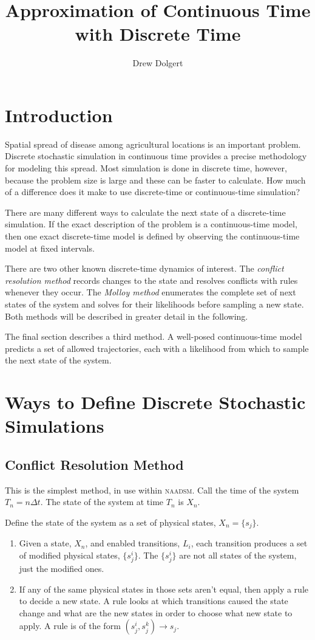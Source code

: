 \documentclass{article}
\title{Approximation of Continuous Time with Discrete Time}
\author{Drew Dolgert}
\begin{document}
\maketitle

\section{Introduction}
Spatial spread of disease among agricultural locations
is an important problem.
Discrete stochastic simulation in continuous time provides
a precise methodology for modeling this spread.
Most simulation is done in discrete time, however,
because the problem size is large and
these can be faster to calculate.
How much of a difference does it make to use discrete-time
or continuous-time simulation?

There are many different ways to calculate the next state of
a discrete-time simulation. If the exact description of the
problem is a continuous-time model, then one exact
discrete-time model is defined by observing the continuous-time
model at fixed intervals.

There are two other known discrete-time dynamics of interest.
The \emph{conflict resolution method} records changes
to the state and resolves conflicts with rules whenever they
occur. The \emph{Molloy method} enumerates the complete
set of next states of the system and solves for their
likelihoods before sampling a new state. Both
methods will be described in greater detail in the following.

The final section describes a third method.
A well-posed continuous-time model predicts a set of
allowed trajectories, each with a likelihood from
which to sample the next state of the system.

\section{Ways to Define Discrete Stochastic Simulations}
\subsection{Conflict Resolution Method}
This is the simplest method, in use within \textsc{naadsm}.
Call the time of the system $T_n=n\Delta t$. The state of
the system at time $T_n$ is $X_n$.

Define the state of the system as a set of physical
states, $X_n=\{s_j\}$.
\begin{enumerate}
\item Given a state, $X_n$, and enabled transitions, $L_i$,
each transition produces a set of modified physical states,
$\{s_j^i\}$. The $\{s_j^i\}$ are not all states of the
system, just the modified ones.
\item If any of the same physical states in those sets aren't
equal, then apply a rule to decide a new state.
A rule looks at which transitions caused the state
change and what are the new states in order to choose
what new state to apply.
A rule is of the form $(s_j^i, s_j^k)\rightarrow s_j$.
\end{enumerate}
\end{document}
